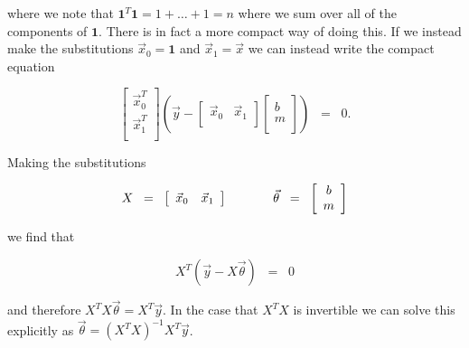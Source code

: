 \documentclass{article}
\begin{document}
\noindent where we note that $\textbf{1}^T\textbf{1} = 1 + \ldots + 1 = n$ where we sum over all of the components of $\textbf{1}$.  There is in fact a more compact way of doing this.  If we instead make the substitutions $\vec{x}_0 = \textbf{1}$ and $\vec{x}_1 = \vec{x}$ we can instead write the compact equation

\begin{equation*}
\left [ \begin{array}{c}
\vec{x}_0^T \\
\vec{x}_1^T \\
\end{array} \right ] \left ( \vec{y} - \left [ \begin{array}{cc}
\vec{x}_0 & \vec{x}_1 \\
\end{array} \right ] \left [ \begin{array}{c}
b \\
m\\
\end{array} \right ] \right ) \;\; =\;\; 0.
\end{equation*}

\noindent Making the substitutions

\begin{equation*}
X \;\; =\;\; \left [ \begin{array}{cc}
\vec{x}_0 & \vec{x}_1 \\
\end{array} \right ] \hspace{3pc} \vec{\theta} \;\; =\;\; \left [ \begin{array}{c}
b \\
m \\
\end{array} \right ]
\end{equation*}

\noindent we find that 

\begin{equation*}
X^T(\vec{y} - X \vec{\theta}) \;\; =\;\; 0
\end{equation*}

\noindent  and therefore $X^TX \vec{\theta} = X^T\vec{y}$.  In the case that $X^TX$ is invertible we can solve this explicitly as $\vec{\theta} = (X^TX)^{-1}X^T\vec{y}$.  
\end{document}
